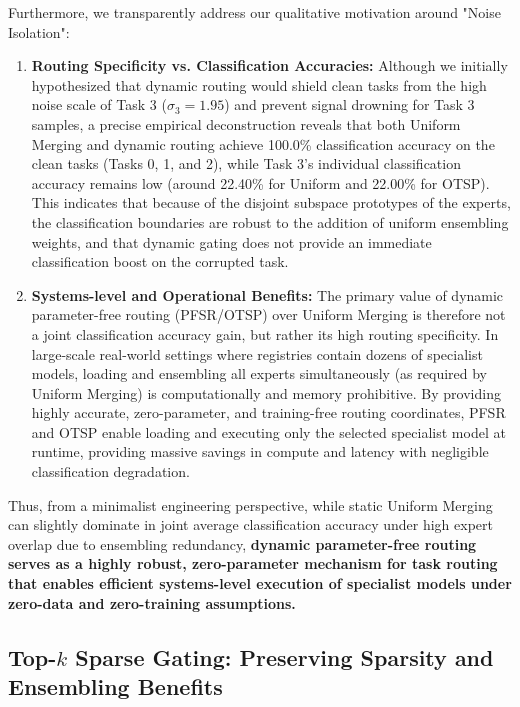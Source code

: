 Furthermore, we transparently address our qualitative motivation around "Noise Isolation":
\begin{enumerate}
    \item \textbf{Routing Specificity vs. Classification Accuracies:} Although we initially hypothesized that dynamic routing would shield clean tasks from the high noise scale of Task 3 ($\sigma_3 = 1.95$) and prevent signal drowning for Task 3 samples, a precise empirical deconstruction reveals that both Uniform Merging and dynamic routing achieve 100.0\% classification accuracy on the clean tasks (Tasks 0, 1, and 2), while Task 3's individual classification accuracy remains low (around 22.40\% for Uniform and 22.00\% for OTSP). This indicates that because of the disjoint subspace prototypes of the experts, the classification boundaries are robust to the addition of uniform ensembling weights, and that dynamic gating does not provide an immediate classification boost on the corrupted task.
    \item \textbf{Systems-level and Operational Benefits:} The primary value of dynamic parameter-free routing (PFSR/OTSP) over Uniform Merging is therefore not a joint classification accuracy gain, but rather its high routing specificity. In large-scale real-world settings where registries contain dozens of specialist models, loading and ensembling all experts simultaneously (as required by Uniform Merging) is computationally and memory prohibitive. By providing highly accurate, zero-parameter, and training-free routing coordinates, PFSR and OTSP enable loading and executing only the selected specialist model at runtime, providing massive savings in compute and latency with negligible classification degradation.
\end{enumerate}

Thus, from a minimalist engineering perspective, while static Uniform Merging can slightly dominate in joint average classification accuracy under high expert overlap due to ensembling redundancy, \textbf{dynamic parameter-free routing serves as a highly robust, zero-parameter mechanism for task routing that enables efficient systems-level execution of specialist models under zero-data and zero-training assumptions.}

\subsection{Top-$k$ Sparse Gating: Preserving Sparsity and Ensembling Benefits}
\label{sec:topk_gating}

